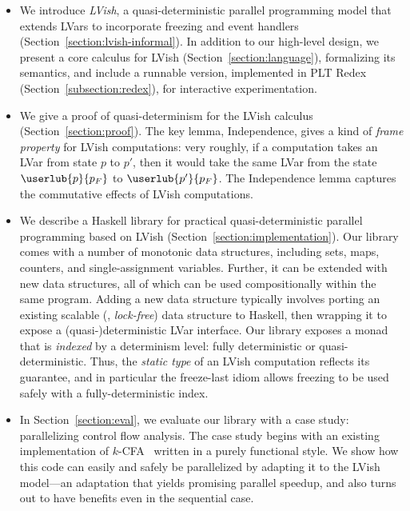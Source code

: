 \begin{itemize}
\item We introduce \emph{LVish}, a quasi-deterministic parallel programming
  model that extends LVars to incorporate freezing and event handlers
  (Section~\ref{section:lvish-informal}).  In addition to our high-level design,
  we present a core calculus for LVish (Section~\ref{section:language}),
  formalizing its semantics, and include a runnable version,
  implemented in PLT Redex (Section~\ref{subsection:redex}), for
  interactive experimentation.
\item We give a proof of quasi-determinism for the LVish calculus
  (Section~\ref{section:proof}). The key lemma, Independence, gives a kind of
  \emph{frame property} for LVish computations: very roughly, if a computation
  takes an LVar from state $p$ to $p'$, then it would take the same LVar from
  the state $\userlub{p}{p_F}$ to $\userlub{p'}{p_F}$.  The Independence lemma
  captures
  the commutative effects of LVish computations.
\item We describe a Haskell library for practical quasi-deterministic parallel
  programming based on LVish (Section~\ref{section:implementation}).  Our
  library comes with a number of monotonic data structures, including sets,
  maps, counters, and single-assignment variables.  Further, it can be extended
  with new data structures, all of which can be used compositionally within the
  same program.  Adding a new data structure typically involves porting an
  existing scalable (\eg, {\em lock-free}) data structure to Haskell, then
  wrapping it to expose a (quasi-)deterministic LVar interface.  Our library exposes
  a monad that is \emph{indexed} by a determinism level: fully deterministic or
  quasi-deterministic.  Thus, the \emph{static type} of an LVish computation
  reflects its guarantee, and in particular the freeze-last idiom allows freezing
  to be used safely with a fully-deterministic index.
\item In Section~\ref{section:eval}, we evaluate our library with a case study:
  parallelizing control flow analysis.  The case study begins with an existing
  implementation of $k$-CFA~\cite{MightkCFABlog} written
  in a purely functional style.  We show how this code can easily and safely be
  parallelized by adapting it to the LVish model---an adaptation that yields
  promising parallel speedup, and also turns out to have benefits even in the
  sequential case.

\end{itemize}
